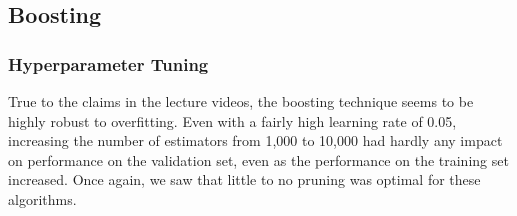 \documentclass[
	letterpaper, %
]{jdf}
\begin{document}
\subsection{Boosting}

\subsubsection{Hyperparameter Tuning}
True to the claims in the lecture videos, the boosting technique seems to be highly robust to overfitting. Even with a fairly high learning rate of 0.05, increasing the number of estimators from 1,000 to 10,000 had hardly any impact on performance on the validation set, even as the performance on the training set increased. Once again, we saw that little to no pruning was optimal for these algorithms.
\end{document}
